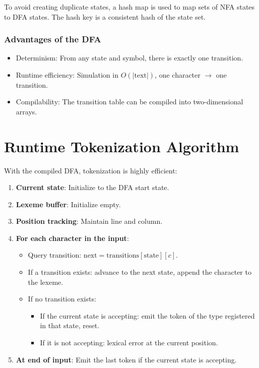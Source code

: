 \documentclass[12pt,a4paper]{report}
\begin{document}
To avoid creating duplicate states, a hash map is used to map sets of NFA states to DFA states.
The hash key is a consistent hash of the state set.

\subsubsection{Advantages of the DFA}

\begin{itemize}
    \item Determinism: From any state and symbol, there is exactly one transition.
    \item Runtime efficiency: Simulation in $O(|\text{text}|)$, one character $\to$ one transition.
    \item Compilability: The transition table can be compiled into two-dimensional arrays.
\end{itemize}

\section{Runtime Tokenization Algorithm}

With the compiled DFA, tokenization is highly efficient:

\begin{enumerate}
    \item \textbf{Current state}: Initialize to the DFA start state.
    \item \textbf{Lexeme buffer}: Initialize empty.
    \item \textbf{Position tracking}: Maintain line and column.
    \item \textbf{For each character in the input}:
    \begin{itemize}
        \item Query transition: $\text{next} = \text{transitions}[\text{state}][c]$.
        \item If a transition exists: advance to the next state, append the character to the lexeme.
        \item If no transition exists:
        \begin{itemize}
            \item If the current state is accepting: emit the token of the type registered in that state, reset.
            \item If it is not accepting: lexical error at the current position.
        \end{itemize}
    \end{itemize}
    
    \item \textbf{At end of input}: Emit the last token if the current state is accepting.
\end{enumerate}
\end{document}
